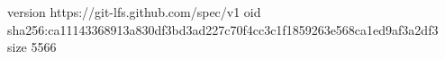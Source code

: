 version https://git-lfs.github.com/spec/v1
oid sha256:ca11143368913a830df3bd3ad227c70f4cc3c1f1859263e568ca1ed9af3a2df3
size 5566
